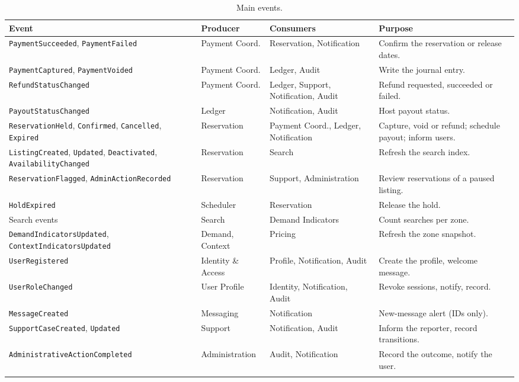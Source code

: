 \begin{longtable}{@{}L{4.2cm}L{2.5cm}L{3.0cm}L{4.1cm}@{}}
\toprule
\textbf{Event} & \textbf{Producer} & \textbf{Consumers} & \textbf{Purpose} \\
\midrule
\endhead
\texttt{PaymentSucceeded}, \texttt{PaymentFailed} & Payment Coord. &
  Reservation, Notification & Confirm the reservation or release dates. \\
\texttt{PaymentCaptured}, \texttt{PaymentVoided} & Payment Coord. &
  Ledger, Audit & Write the journal entry. \\
\texttt{Refund\allowbreak Status\allowbreak Changed} & Payment Coord. & Ledger, Support,
  Notification, Audit & Refund requested, succeeded or failed. \\
\texttt{Payout\allowbreak Status\allowbreak Changed} & Ledger & Notification, Audit & Host payout
  status. \\
\texttt{ReservationHeld}, \texttt{Confirmed}, \texttt{Cancelled},
  \texttt{Expired} & Reservation & Payment Coord., Ledger, Notification &
  Capture, void or refund; schedule payout; inform users. \\
\texttt{ListingCreated}, \texttt{Updated}, \texttt{Deactivated},
  \texttt{Availability\allowbreak Changed} & Reservation & Search & Refresh the search
  index. \\
\texttt{Reservation\allowbreak Flagged}, \texttt{Admin\allowbreak Action\allowbreak Recorded} & Reservation &
  Support, Administration & Review reservations of a paused listing. \\
\texttt{HoldExpired} & Scheduler & Reservation & Release the hold. \\
Search events & Search & Demand Indicators & Count searches per zone. \\
\texttt{Demand\allowbreak Indicators\allowbreak Updated}, \texttt{Context\allowbreak Indicators\allowbreak Updated} &
  Demand, Context & Pricing & Refresh the zone snapshot. \\
\texttt{UserRegistered} & Identity \& Access & Profile, Notification,
  Audit & Create the profile, welcome message. \\
\texttt{UserRoleChanged} & User Profile & Identity, Notification, Audit &
  Revoke sessions, notify, record. \\
\texttt{MessageCreated} & Messaging & Notification & New-message alert (IDs
  only). \\
\texttt{Support\allowbreak Case\allowbreak Created}, \texttt{Updated} & Support & Notification,
  Audit & Inform the reporter, record transitions. \\
\texttt{Administrative\allowbreak Action\allowbreak Completed} & Administration & Audit,
  Notification & Record the outcome, notify the user. \\
\bottomrule
\caption{Main events.}
\label{tab:events}
\end{longtable}

